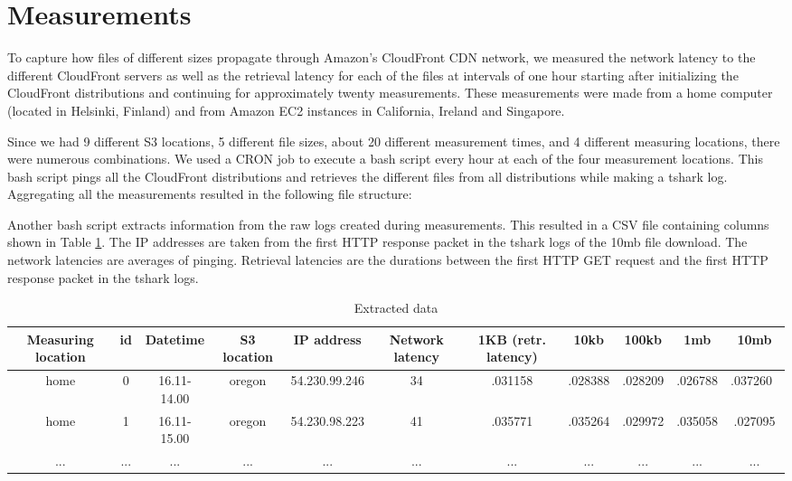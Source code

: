 \documentclass[conference]{IEEEtran}
\begin{document}
\section{Measurements}
To capture how files of different sizes propagate through Amazon's CloudFront CDN network, we measured the network latency to the different CloudFront servers as well as the retrieval latency for each of the files at intervals of one hour starting after initializing the CloudFront distributions and continuing for approximately twenty measurements. These measurements were made from a home computer (located in Helsinki, Finland) and from Amazon EC2 instances in California, Ireland and Singapore.


Since we had 9 different S3 locations, 5 different file sizes, about 20 different measurement times, and 4 different measuring locations, there were numerous combinations. We used a CRON job to execute a bash script every hour at each of the four measurement locations. This bash script pings all the CloudFront distributions and retrieves the different files from all distributions while making a tshark log. Aggregating all the measurements resulted in the following file structure:\\


Another bash script extracts information from the raw logs created during measurements. This resulted in a CSV file containing columns shown in Table \ref{table:extracteddata}. The IP addresses are taken from the first HTTP response packet in the tshark logs of the 10mb file download. The network latencies are averages of pinging. Retrieval latencies are the durations between the first HTTP GET request and the first HTTP response packet in the tshark logs.

\begin{table}
\renewcommand{\arraystretch}{1.3}
\caption{Extracted data}
\centering
\begin{tabular}{|c|c|c|c|c|c|c|c|c|c|c|}
\hline
\bfseries Measuring location & \bfseries id & \bfseries Datetime & \bfseries S3 location & \bfseries IP address & \bfseries Network latency & \bfseries 1KB (retr. latency) & \bfseries 10kb & \bfseries 100kb & \bfseries 1mb & \bfseries 10mb \\
\hline\hline
home & 0 & 16.11-14.00 & oregon & 54.230.99.246 & 34 & .031158 & .028388 & .028209 & .026788 & .037260 \\
\hline
home & 1 & 16.11-15.00 & oregon & 54.230.98.223 & 41 & .035771 & .035264 & .029972 & .035058 & .027095 \\
\hline
... & ... & ... & ... & ... & ... & ... & ... & ... & ... & ... \\
\hline
\end{tabular}
\label{table:extracteddata}
\end{table}
\end{document}

